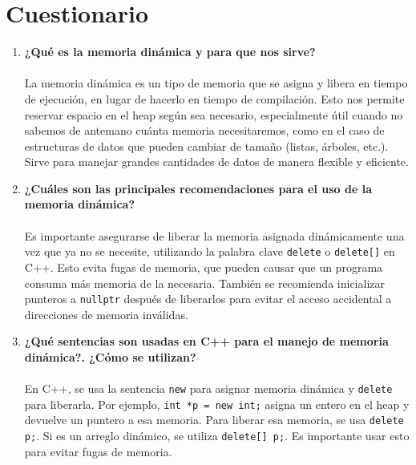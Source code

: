 \documentclass{article}
\begin{document}
\section{Cuestionario}
    \begin{enumerate}
        \item \textbf{¿Qué es la memoria dinámica y para que nos sirve?} \\\\
        La memoria dinámica es un tipo de memoria que se asigna y libera en tiempo de ejecución, en lugar de hacerlo en tiempo de compilación. Esto nos permite reservar espacio en el heap según sea necesario, especialmente útil cuando no sabemos de antemano cuánta memoria necesitaremos, como en el caso de estructuras de datos que pueden cambiar de tamaño (listas, árboles, etc.). Sirve para manejar grandes cantidades de datos de manera flexible y eficiente.
            
        \item \textbf{¿Cuáles son las principales recomendaciones para el uso de la memoria dinámica?} \\\\
        Es importante asegurarse de liberar la memoria asignada dinámicamente una vez que ya no se necesite, utilizando la palabra clave \texttt{delete} o \texttt{delete[]} en C++. Esto evita fugas de memoria, que pueden causar que un programa consuma más memoria de la necesaria. También se recomienda inicializar punteros a \texttt{nullptr} después de liberarlos para evitar el acceso accidental a direcciones de memoria inválidas. 

        \item \textbf{¿Qué sentencias son usadas en C++ para el manejo de memoria dinámica?. ¿Cómo se utilizan?
        } \\\\
        En C++, se usa la sentencia \texttt{new} para asignar memoria dinámica y \texttt{delete} para liberarla. Por ejemplo, \texttt{int *p = new int;} asigna un entero en el heap y devuelve un puntero a esa memoria. Para liberar esa memoria, se usa \texttt{delete p;}. Si es un arreglo dinámico, se utiliza \texttt{delete[] p;}. Es importante usar esto para evitar fugas de memoria.
        
    \end{enumerate}

\end{document}

